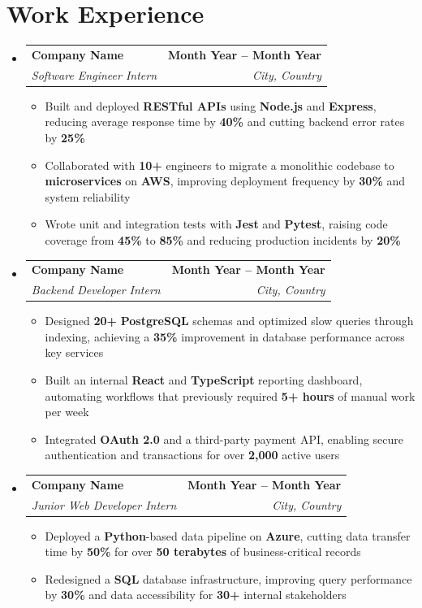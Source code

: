 \documentclass[letterpaper,11pt]{article}
\makeatletter
\newcommand{\resumeItem}[1]{
  \item\small{
    {#1 \vspace{0pt}}
  }
}
\newcommand{\resumeSubheading}[4]{
  \vspace{-2pt}\item
    \begin{tabular*}{1.0\textwidth}[t]{l@{\extracolsep{\fill}}r}
      \textbf{#1} & \textbf{\small #2} \\
      \textit{\small#3} & \textit{\small #4} \\
    \end{tabular*}\vspace{-7pt}
}
\newcommand{\resumeSubHeadingListStart}{\begin{itemize}[leftmargin=0.0in, label={}]}
\newcommand{\resumeSubHeadingListEnd}{\end{itemize}}\vspace{0pt}
\newcommand{\resumeItemListStart}{\begin{itemize}}
\newcommand{\resumeItemListEnd}{\end{itemize}\vspace{-5pt}}
\makeatother
\begin{document}
\section{Work Experience}
    \resumeSubHeadingListStart
                \resumeSubheading{Company Name}{Month Year -- Month Year}{Software Engineer Intern}{City, Country} 
                \resumeItemListStart
                    \resumeItem{Built and deployed \textbf{RESTful APIs} using \textbf{Node.js} and \textbf{Express}, reducing average response time by \textbf{40\%} and cutting backend error rates by \textbf{25\%}}
                    \resumeItem{Collaborated with \textbf{10+} engineers to migrate a monolithic codebase to \textbf{microservices} on \textbf{AWS}, improving deployment frequency by \textbf{30\%} and system reliability}
                    \resumeItem{Wrote unit and integration tests with \textbf{Jest} and \textbf{Pytest}, raising code coverage from \textbf{45\%} to \textbf{85\%} and reducing production incidents by \textbf{20\%}}
                    \resumeItemListEnd
            \resumeSubheading{Company Name}{Month Year -- Month Year}{Backend Developer Intern}{City, Country} 
                \resumeItemListStart
                    \resumeItem{Designed \textbf{20+} \textbf{PostgreSQL} schemas and optimized slow queries through indexing, achieving a \textbf{35\%} improvement in database performance across key services}
                    \resumeItem{Built an internal \textbf{React} and \textbf{TypeScript} reporting dashboard, automating workflows that previously required \textbf{5+ hours} of manual work per week}
                    \resumeItem{Integrated \textbf{OAuth 2.0} and a third-party payment API, enabling secure authentication and transactions for over \textbf{2,000} active users}
                    \resumeItemListEnd
            \resumeSubheading{Company Name}{Month Year -- Month Year}{Junior Web Developer Intern}{City, Country}
                \resumeItemListStart
                    \resumeItem{Deployed a \textbf{Python}-based data pipeline on \textbf{Azure}, cutting data transfer time by \textbf{50\%} for over \textbf{50 terabytes} of business-critical records}
                    \resumeItem{Redesigned a \textbf{SQL} database infrastructure, improving query performance by \textbf{30\%} and data accessibility for \textbf{30+} internal stakeholders}
                    \resumeItemListEnd
    \resumeSubHeadingListEnd
    \vspace{-12pt}

\end{document}
